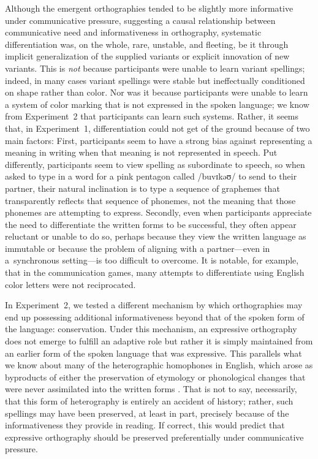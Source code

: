\documentclass[doc,biblatex]{apa7}
\begin{document}
Although the emergent orthographies tended to be slightly more informative under communicative pressure, suggesting a causal relationship between communicative need and informativeness in orthography, systematic differentiation was, on the whole, rare, unstable, and fleeting, be it through implicit generalization of the supplied variants or explicit innovation of new variants. This is \textit{not} because participants were unable to learn variant spellings; indeed, in many cases variant spellings were stable but ineffectually conditioned on shape rather than color. Nor was it because participants were unable to learn a system of color marking that is not expressed in the spoken language; we know from Experiment~2 that participants can learn such systems. Rather, it seems that, in Experiment~1, differentiation could not get of the ground because of two main factors: First, participants seem to have a strong bias against representing a meaning in writing when that meaning is not represented in speech. Put differently, participants seem to view spelling as subordinate to speech, so when asked to type in a word for a pink pentagon called /buvɪkəʊ/ to send to their partner, their natural inclination is to type a sequence of graphemes that transparently reflects that sequence of phonemes, not the meaning that those phonemes are attempting to express. Secondly, even when participants appreciate the need to differentiate the written forms to be successful, they often appear reluctant or unable to do so, perhaps because they view the written language as immutable or because the problem of aligning with a partner---even in a~synchronous setting---is too difficult to overcome. It is notable, for example, that in the communication games, many attempts to differentiate using English color letters were not reciprocated.

In Experiment~2, we tested a different mechanism by which orthographies may end up possessing additional informativeness beyond that of the spoken form of the language: conservation. Under this mechanism, an expressive orthography does not emerge to fulfill an adaptive role but rather it is simply maintained from an earlier form of the spoken language that was expressive. This parallels what we know about many of the heterographic homophones in English, which arose as byproducts of either the preservation of etymology or phonological changes that were never assimilated into the written forms \parencite{Berg:2021}. That is not to say, necessarily, that this form of heterography is entirely an accident of history; rather, such spellings may have been preserved, at least in part, precisely because of the informativeness they provide in reading. If correct, this would predict that expressive orthography should be preserved preferentially under communicative pressure.
\end{document}
